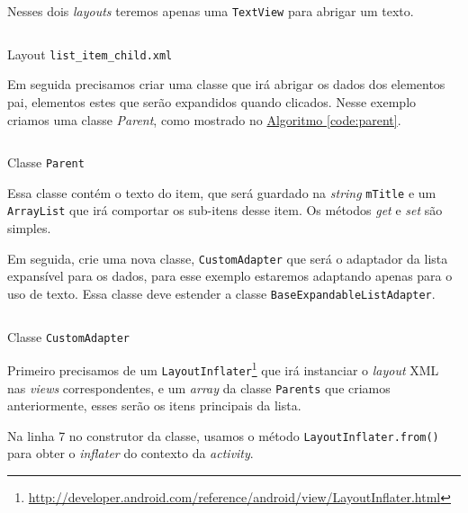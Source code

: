 \documentclass[a4paper,12pt,brazil,oneside]{book}
\begin{document}
Nesses dois \emph{layouts} teremos apenas uma \texttt{TextView} para abrigar um texto.

\begin{listing}[H]
\inputminted[linenos=true,fontsize=\small,frame=lines, framesep=2mm, tabsize=2,numbersep=5pt]{xml}{src/design/list-item-child.xml}
\caption{Layout \texttt{list\_item\_child.xml}}
\end{listing}	

Em seguida precisamos criar uma classe que irá abrigar os dados dos elementos pai, elementos estes que serão expandidos quando clicados. Nesse exemplo criamos uma classe \emph{Parent}, como mostrado no \hyperref[code:parent]{Algoritmo \ref*{code:parent}}.

\begin{listing}[H]
\inputminted[linenos=true,fontsize=\small,frame=lines, framesep=2mm, tabsize=2,numbersep=5pt]{java}{src/design/parent.java}
\caption{Classe \texttt{Parent}}
\label{code:parent}
\end{listing}	

Essa classe contém o texto do item, que será guardado na \emph{string} \texttt{mTitle} e um \texttt{ArrayList} que irá comportar os sub-itens desse item. Os métodos \emph{get} e \emph{set} são simples.

Em seguida, crie uma nova classe, \texttt{CustomAdapter} que será o adaptador da lista expansível para os dados, para esse exemplo estaremos adaptando apenas para o uso de texto. Essa classe deve estender a classe \texttt{BaseExpandableListAdapter}.

\newenvironment{code}{\captionsetup{type=listing}}{}

\begin{code}
\inputminted[linenos=true,fontsize=\small,frame=lines, framesep=2mm, tabsize=2,numbersep=5pt]{java}{src/design/customadapter.java}
\caption{Classe \texttt{CustomAdapter}}
\end{code}

\parskip 1pt 

Primeiro precisamos de um \texttt{LayoutInflater}\footnote{\href{http://developer.android.com/reference/android/view/LayoutInflater.html}{http://developer.android.com/reference/android/view/LayoutInflater.html}} que irá instanciar o \emph{layout} XML nas \emph{views} correspondentes, e um \emph{array} da classe \texttt{Parents} que criamos anteriormente, esses serão os itens principais da lista.

Na linha 7 no construtor da classe, usamos o método \texttt{LayoutInflater.from()} para obter o \emph{inflater} do contexto da \emph{activity}. 
\end{document}
